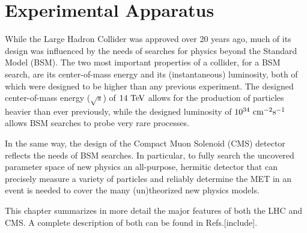 \chapter{Experimental Apparatus}

While the Large Hadron Collider was approved over 20 years ago, much of its design was influenced by the needs of searches for physics beyond the Standard Model (BSM).
The two most important properties of a collider, for a BSM search, are its center-of-mass energy and its (instantaneous) luminosity, both of which were designed to be higher than any previous experiment. 
The designed center-of-mass energy ($\sqrt{s}$) of $14~\mathrm{Te\kern -0.1em V}$ allows for the production of particles heavier than ever previously, while the designed luminosity of $10^{34}~\mathrm{cm}^{-2}\mathrm{s}^{-1}$ allows BSM searches to probe very rare processes.

In the same way, the design of the Compact Muon Solenoid (CMS) detector reflects the needs of BSM searches.
In particular, to fully search the uncovered parameter space of new physics an all-purpose, hermitic detector that can precisely measure a variety of particles and reliably determine the MET in an event is needed to cover the many (un)theorized new physics models.

This chapter summarizes in more detail the major features of both the LHC and CMS.
A complete description of both can be found in Refs.[include].

